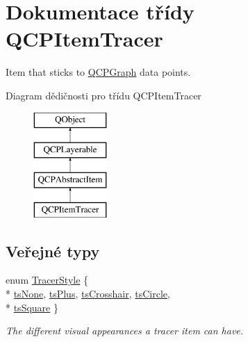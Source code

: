 \hypertarget{classQCPItemTracer}{}\section{Dokumentace třídy Q\+C\+P\+Item\+Tracer}
\label{classQCPItemTracer}


Item that sticks to \hyperlink{classQCPGraph}{Q\+C\+P\+Graph} data points.  


Diagram dědičnosti pro třídu Q\+C\+P\+Item\+Tracer\begin{figure}[H]
\begin{center}
\leavevmode
\includegraphics[height=4.000000cm]{classQCPItemTracer}
\end{center}
\end{figure}
\subsection*{Veřejné typy}
\begin{DoxyCompactItemize}
\item 
enum \hyperlink{classQCPItemTracer_a2f05ddb13978036f902ca3ab47076500}{Tracer\+Style} \{ \\*
\hyperlink{classQCPItemTracer_a2f05ddb13978036f902ca3ab47076500aac27462c79146225bfa8fba24d2ee8a4}{ts\+None}, 
\hyperlink{classQCPItemTracer_a2f05ddb13978036f902ca3ab47076500a3323fb04017146e4885e080a459472fa}{ts\+Plus}, 
\hyperlink{classQCPItemTracer_a2f05ddb13978036f902ca3ab47076500af562ec81ac3ba99e26ef8540cf1ec16f}{ts\+Crosshair}, 
\hyperlink{classQCPItemTracer_a2f05ddb13978036f902ca3ab47076500ae2252c28f4842880d71e9f94e69de94e}{ts\+Circle}, 
\\*
\hyperlink{classQCPItemTracer_a2f05ddb13978036f902ca3ab47076500a4ed5f01f2c5fd86d980366d79f481b9b}{ts\+Square}
 \}\begin{DoxyCompactList}\small\item\em The different visual appearances a tracer item can have. \end{DoxyCompactList}
\end{DoxyCompactItemize}
